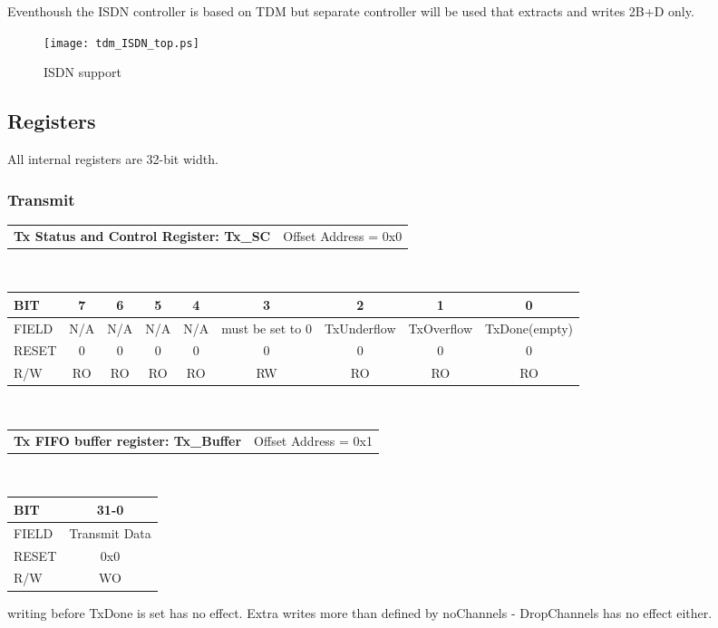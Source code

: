 \documentclass[a4paper,11pt]{article}
\begin{document}
Eventhoush the ISDN controller is based on TDM but separate controller will be used that extracts and writes 2B+D only.

\begin{figure}[!h]
\texttt{[image: tdm\_ISDN\_top.ps]}
\caption{ISDN support}\label{isdn}
\end{figure}


\subsection{Registers}
All internal registers are 32-bit width.

\subsubsection{Transmit}

\begin{tabular}{l l}
\textbf{Tx Status and Control Register: Tx\_SC} & Offset Address = 0x0\\
\end{tabular}\\

\begin{tabular}{|l||c|c|c|c|c|c|c|c|}
\hline
\hline
BIT   & 7 & 6 & 5 & 4 & 3 & 2 & 1 & 0\\ 
\hline
FIELD &N/A &N/A &N/A & N/A& must be set to 0& TxUnderflow& TxOverflow& TxDone(empty)\\
\hline
RESET & 0& 0& 0& 0& 0& 0& 0& 0\\
\hline
R/W   & RO& RO& RO&   RO&  RW&   RO& RO& RO\\
\hline
\end{tabular}\\

\begin{tabular}{l l}
\textbf{Tx FIFO buffer register: Tx\_Buffer} & Offset Address = 0x1\\
\end{tabular}\\

\begin{tabular}{|l||c|}
\hline
\hline
BIT   & 31-0\\ 
\hline
FIELD & Transmit Data\\
\hline
RESET & 0x0\\
\hline
R/W   & WO\\
\hline
\end{tabular}
writing before TxDone is set has no effect. Extra writes more than defined by noChannels - DropChannels has no effect either.
\end{document}
